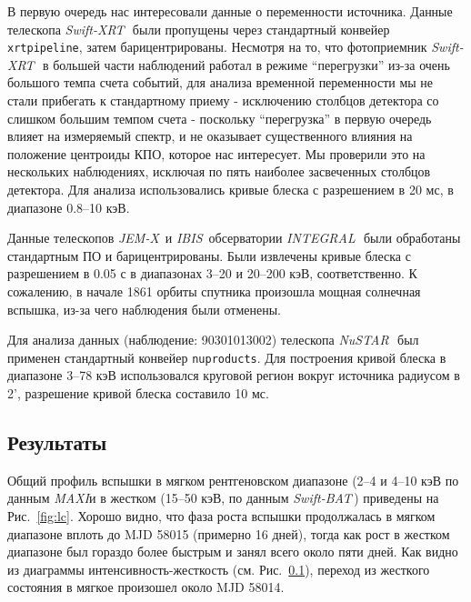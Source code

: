 \documentclass{pazhb}
\def\maxi{{\em MAXI}}
\def\swiftx{{\em Swift-XRT\,}}
\def\swiftb{{\em Swift-BAT\,}}
\def\nustar{{\em NuSTAR\,}}
\def\integral{{\em INTEGRAL\,}}
\def\jemx{{\em JEM-X}}
\def\ibis{ {\em IBIS}}
\begin{document}
В первую очередь нас интересовали данные о переменности источника. Данные телескопа \swiftx\, были пропущены через стандартный конвейер \texttt{xrtpipeline}, затем барицентрированы. Несмотря на то, что фотоприемник \swiftx\, в большей части наблюдений работал в режиме ``перегрузки'' из-за очень большого темпа счета событий, для анализа временной переменности мы не стали прибегать к стандартному приему - исключению столбцов детектора со слишком большим темпом счета - поскольку ``перегрузка'' в первую очередь влияет на измеряемый спектр, и не оказывает существенного влияния на положение центроиды КПО, которое нас интересует. Мы проверили это на нескольких наблюдениях, исключая по пять наиболее засвеченных столбцов детектора. Для анализа использовались кривые блеска с разрешением в 20 мс, в диапазоне 0.8--10 кэВ.

Данные телескопов \jemx\, \citep{lund03} и \ibis\, \citep{ubertini03} обсерватории \integral\, были обработаны стандартным ПО и барицентрированы. Были извлечены кривые блеска с разрешением в 0.05 с в диапазонах 3--20 и 20--200 кэВ, соответственно. К сожалению, в начале 1861 орбиты спутника произошла мощная солнечная вспышка, из-за чего наблюдения были отменены.

Для анализа данных (наблюдение: 90301013002) телескопа \nustar\, был применен стандартный конвейер \texttt{nuproducts}. Для построения кривой блеска в диапазоне 3--78 кэВ использовался круговой регион вокруг источника радиусом в 2', разрешение кривой блеска составило 10 мс. 

\subsection{Результаты}	

Общий профиль вспышки в мягком рентгеновском диапазоне (2--4 и 4--10 кэВ по данным \maxi и в жестком (15--50 кэВ, по данным \swiftb) приведены на Рис.~\ref{fig:lc}. Хорошо видно, что фаза роста вспышки продолжалась в мягком диапазоне вплоть до MJD 58015 (примерно 16 дней), тогда как рост в жестком диапазоне был гораздо более быстрым и занял всего около пяти дней. Как видно из диаграммы интенсивность-жесткость (см. Рис.~\ref{}), переход из жесткого состояния в мягкое произошел около MJD 58014. 
\end{document}
